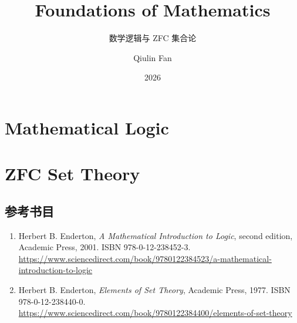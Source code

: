 \documentclass{../toolchain/latex/qlnotes-native}
\title{Foundations of Mathematics}
\subtitle{数学逻辑与 ZFC 集合论}
\author{Qiulin Fan}
\date{2026}
\begin{document}
\frontmatter
\maketitle
\tableofcontents
\mainmatter


\part{Mathematical Logic}

\part{ZFC Set Theory}

\backmatter
\chapter{参考书目}
\begin{enumerate}
\item Herbert B. Enderton, \emph{A Mathematical Introduction to Logic},
  second edition, Academic Press, 2001. ISBN 978-0-12-238452-3.
  \url{https://www.sciencedirect.com/book/9780122384523/a-mathematical-introduction-to-logic}
\item Herbert B. Enderton, \emph{Elements of Set Theory}, Academic Press, 1977.
  ISBN 978-0-12-238440-0.
  \url{https://www.sciencedirect.com/book/9780122384400/elements-of-set-theory}
\end{enumerate}
\end{document}
